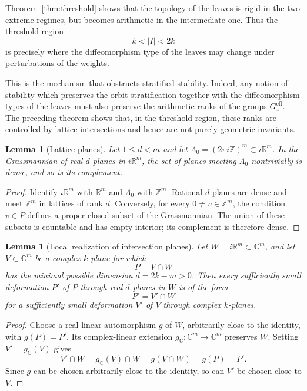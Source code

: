 \documentclass[11pt]{amsart}
\newtheorem{lemma}[theorem]{Lemma}
\theoremstyle{definition}
\theoremstyle{remark}
\newcommand{\Z}{\mathbb{Z}}
\newcommand{\C}{\mathbb{C}}
\newcommand{\R}{\mathbb{R}}
\begin{document}
Theorem~\ref{thm:threshold} shows that the topology of the leaves is rigid in the two extreme regimes, but becomes arithmetic in the intermediate one.
Thus the threshold region 
\[
	k<|I|<2k
\] 
is precisely where the diffeomorphism type of the leaves may change under perturbations of the weights.

This is the mechanism that obstructs stratified stability.
Indeed, any notion of stability which preserves the orbit stratification together with the diffeomorphism types of the leaves must also preserve the arithmetic ranks of the groups $G_z^{\mathrm{eff}}$.
The preceding theorem shows that, in the threshold region, these ranks are controlled by lattice intersections and hence are not purely geometric invariants.

\begin{lemma}[Lattice planes]
	\label{lem:lattice-instability}
	Let $1\le d<m$ and let $\Lambda_0=(2\pi i\Z)^m\subset i\R^m$.
	In the Grassmannian of real $d$-planes in $i\R^m$, the set of planes meeting $\Lambda_0$ nontrivially is dense, and so is its complement.
\end{lemma}

\begin{proof}
	Identify $i\R^m$ with $\R^m$ and $\Lambda_0$ with $\Z^m$.
	Rational $d$-planes are dense and meet $\Z^m$ in lattices of rank $d$.
	Conversely, for every $0\ne v\in\Z^m$, the condition $v\in P$ defines a proper closed subset of the Grassmannian.
	The union of these subsets is countable and has empty interior; its complement is therefore dense.
\end{proof}

\begin{lemma}[Local realization of intersection planes]
	\label{lem:realization}
	Let $W=i\R^m\subset\C^m$, and let $V\subset\C^m$ be a complex $k$-plane for which
	\[
		P=V\cap W
	\]
	has the minimal possible dimension $d=2k-m>0$.
	Then every sufficiently small deformation $P'$ of $P$ through real $d$-planes in $W$ is of the form
	\[
		P'=V'\cap W
	\]
	for a sufficiently small deformation $V'$ of $V$ through complex $k$-planes.
\end{lemma}

\begin{proof}
	Choose a real linear automorphism $g$ of $W$, arbitrarily close to the identity, with $g(P)=P'$.
	Its complex-linear extension $g_{\C}:\C^m\to\C^m$ preserves $W$.
	Setting $V'=g_{\C}(V)$ gives
	\[
		V'\cap W=g_{\C}(V)\cap W=g(V\cap W)=g(P)=P'.
	\]
	Since $g$ can be chosen arbitrarily close to the identity, so can $V'$
	be chosen close to $V$.
\end{proof}
\end{document}
